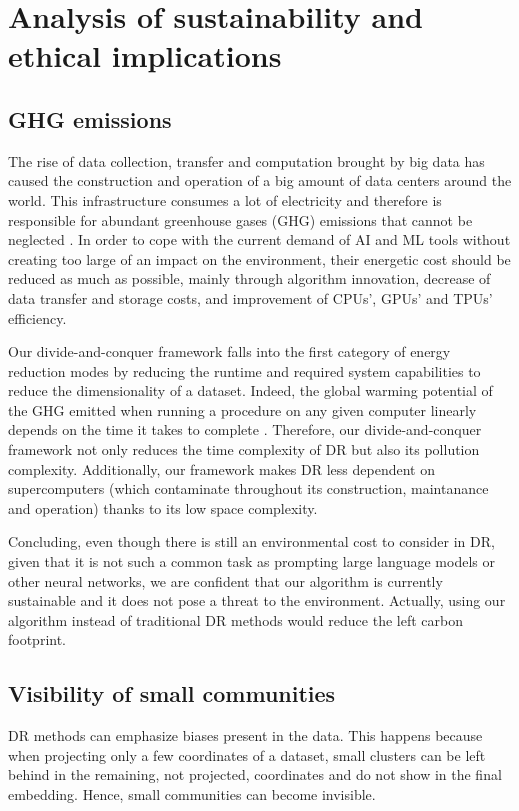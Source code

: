 \section{Analysis of sustainability and ethical implications}

\subsection{GHG emissions}

The rise of data collection, transfer and computation brought by big data has caused the construction and operation of a big amount of data centers around the world. This infrastructure consumes a lot of electricity and therefore is responsible for abundant greenhouse gases (GHG) emissions that cannot be neglected \citep{IEA2025, Brierley2023}. In order to cope with the current demand of AI and ML tools without creating too large of an impact on the environment, their energetic cost should be reduced as much as possible, mainly through algorithm innovation, decrease of data transfer and storage costs, and improvement of CPUs', GPUs' and TPUs' efficiency.

Our divide-and-conquer framework falls into the first category of energy reduction modes by reducing the runtime and required system capabilities to reduce the dimensionality of a dataset. Indeed, the global warming potential of the GHG emitted when running a procedure on any given computer linearly depends on the time it takes to complete \citep{Lannelongue2021}. Therefore, our divide-and-conquer framework not only reduces the time complexity of DR but also its pollution complexity. Additionally, our framework makes DR less dependent on supercomputers (which contaminate throughout its construction, maintanance and operation) thanks to its low space complexity.

Concluding, even though there is still an environmental cost to consider in DR, given that it is not such a common task as prompting large language models or other neural networks, we are confident that our algorithm is currently sustainable and it does not pose a threat to the environment. Actually, using our algorithm instead of traditional DR methods would reduce the left carbon footprint.

\subsection{Visibility of small communities}

DR methods can emphasize biases present in the data. This happens because when projecting only a few coordinates of a dataset, small clusters can be left behind in the remaining, not projected, coordinates and do not show in the final embedding. Hence, small communities can become invisible.

